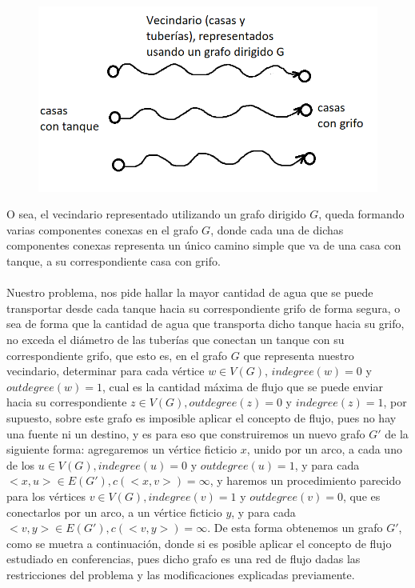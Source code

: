 \documentclass{article}
\begin{document}
    \begin{figure}[h]
        \includegraphics[scale = 0.5]{img/Image1Problem1.png}
        \centering
    \end{figure}

    O sea, el vecindario representado utilizando un grafo dirigido $G$, queda formando varias componentes conexas en el grafo $G$,
    donde cada una de dichas componentes conexas representa un \'unico camino simple que va de una casa con tanque, a su correspondiente
    casa con grifo.\\\\

    Nuestro problema, nos pide hallar la mayor cantidad de agua que se puede transportar desde cada tanque hacia su correspondiente grifo de forma segura, o sea 
    de forma que la cantidad de agua que transporta dicho tanque hacia su grifo, no exceda el di\'ametro de las tuber\'ias que conectan un tanque con su correspondiente
    grifo, que esto es, en el grafo $G$ que representa nuestro vecindario, determinar para cada v\'ertice $w \in V(G)$, $indegree(w) = 0$ y $outdegree(w) = 1$, cual es la cantidad m\'axima
    de flujo que se puede enviar hacia su correspondiente $z \in V(G), outdegree(z) = 0$ y $indegree(z) = 1$, por supuesto, sobre este grafo es imposible  aplicar el concepto de flujo,
    pues no hay una fuente ni un destino, y es para eso que construiremos un nuevo grafo $G'$ de la siguiente forma: agregaremos un v\'ertice ficticio $x$, unido por un arco, a cada uno de los $u \in V(G), indegree(u) = 0$ y $outdegree(u) = 1$, y para cada 
    $<x,u> \in E(G'), c(<x,v>) = \infty$, y haremos un procedimiento parecido para los v\'ertices $v \in V(G), indegree(v) = 1$ y $outdegree(v) = 0$, que es conectarlos por un arco, a un v\'ertice ficticio $y$, y
    para cada $<v,y> \in E(G'), c(<v,y>) = \infty$. De esta forma obtenemos un grafo $G'$, como se muetra a continuaci\'on, donde si es posible aplicar el concepto de flujo estudiado en conferencias, pues dicho grafo es una red de flujo
    dadas las restricciones del problema y las modificaciones explicadas previamente.\\
    
\end{document}
